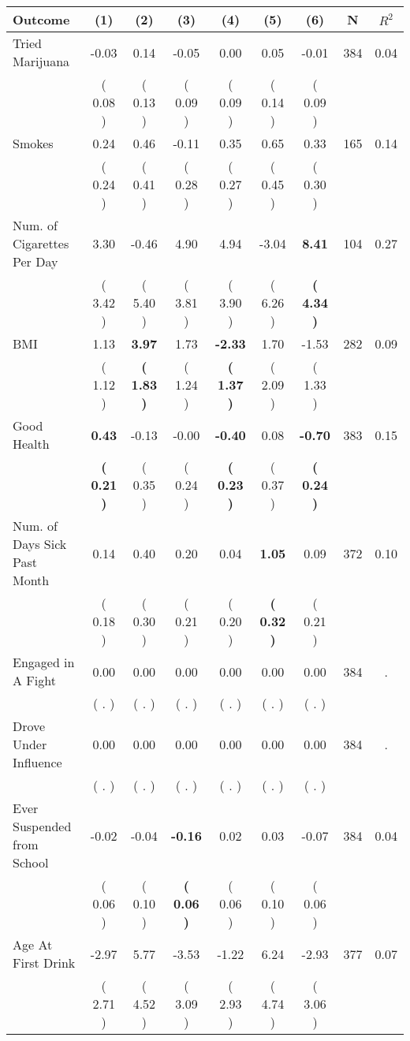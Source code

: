 \begin{tabular}{lcccccccc}
\toprule
 \textbf{Outcome} & \textbf{(1)} & \textbf{(2)} & \textbf{(3)} & \textbf{(4)} & \textbf{(5)} & \textbf{(6)} & \textbf{N} & \textbf{$ R^2$} \\
\midrule
Tried Marijuana &     -0.03 &      0.14 &     -0.05 &      0.00 &      0.05 &     -0.01 & 384 &       0.04 \\ 
 & (     0.08 ) & (     0.13 ) & (     0.09 ) & (     0.09 ) & (     0.14 ) & (     0.09 ) & \\
Smokes &      0.24 &      0.46 &     -0.11 &      0.35 &      0.65 &      0.33 & 165 &       0.14 \\ 
 & (     0.24 ) & (     0.41 ) & (     0.28 ) & (     0.27 ) & (     0.45 ) & (     0.30 ) & \\
Num. of Cigarettes Per Day &      3.30 &     -0.46 &      4.90 &      4.94 &     -3.04 & \textbf{     8.41} & 104 &       0.27 \\ 
 & (     3.42 ) & (     5.40 ) & (     3.81 ) & (     3.90 ) & (     6.26 ) & \textbf{(     4.34 )} & \\
BMI &      1.13 & \textbf{     3.97} &      1.73 & \textbf{    -2.33} &      1.70 &     -1.53 & 282 &       0.09 \\ 
 & (     1.12 ) & \textbf{(     1.83 )} & (     1.24 ) & \textbf{(     1.37 )} & (     2.09 ) & (     1.33 ) & \\
Good Health & \textbf{     0.43} &     -0.13 &     -0.00 & \textbf{    -0.40} &      0.08 & \textbf{    -0.70} & 383 &       0.15 \\ 
 & \textbf{(     0.21 )} & (     0.35 ) & (     0.24 ) & \textbf{(     0.23 )} & (     0.37 ) & \textbf{(     0.24 )} & \\
Num. of Days Sick Past Month &      0.14 &      0.40 &      0.20 &      0.04 & \textbf{     1.05} &      0.09 & 372 &       0.10 \\ 
 & (     0.18 ) & (     0.30 ) & (     0.21 ) & (     0.20 ) & \textbf{(     0.32 )} & (     0.21 ) & \\
Engaged in A Fight &      0.00 &      0.00 &      0.00 &      0.00 &      0.00 &      0.00 & 384 &          . \\ 
 & (        . ) & (        . ) & (        . ) & (        . ) & (        . ) & (        . ) & \\
Drove Under Influence &      0.00 &      0.00 &      0.00 &      0.00 &      0.00 &      0.00 & 384 &          . \\ 
 & (        . ) & (        . ) & (        . ) & (        . ) & (        . ) & (        . ) & \\
Ever Suspended from School &     -0.02 &     -0.04 & \textbf{    -0.16} &      0.02 &      0.03 &     -0.07 & 384 &       0.04 \\ 
 & (     0.06 ) & (     0.10 ) & \textbf{(     0.06 )} & (     0.06 ) & (     0.10 ) & (     0.06 ) & \\
Age At First Drink &     -2.97 &      5.77 &     -3.53 &     -1.22 &      6.24 &     -2.93 & 377 &       0.07 \\ 
 & (     2.71 ) & (     4.52 ) & (     3.09 ) & (     2.93 ) & (     4.74 ) & (     3.06 ) & \\
\bottomrule
\end{tabular}
